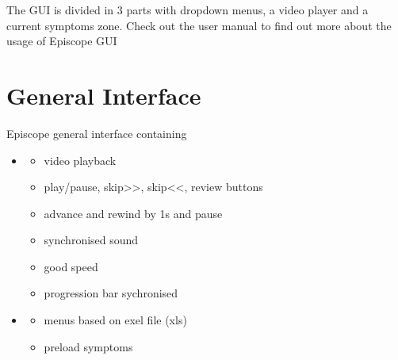 \documentclass[letterpaper,10pt,english]{sphinxmanual}
\begin{document}
\sphinxAtStartPar
The GUI is divided in 3 parts with dropdown menus, a video player and a current symptoms zone.
Check out the user manual to find out more about the usage of Episcope GUI

\sphinxstepscope


\chapter{General Interface}
\label{\detokenize{general_interface:module-general_interface}}\label{\detokenize{general_interface:general-interface}}\label{\detokenize{general_interface::doc}}
\sphinxAtStartPar
Episcope general interface containing
\begin{itemize}
\item {} \begin{description}
\begin{itemize}
\item {} 
\sphinxAtStartPar
video playback

\item {} 
\sphinxAtStartPar
play/pause, skip\textgreater{}\textgreater{}, skip\textless{}\textless{}, review buttons

\item {} 
\sphinxAtStartPar
advance and rewind by 1s and pause

\item {} 
\sphinxAtStartPar
synchronised sound

\item {} 
\sphinxAtStartPar
good speed

\item {} 
\sphinxAtStartPar
progression bar sychronised

\end{itemize}

\end{description}

\item {} \begin{description}
\begin{itemize}
\item {} 
\sphinxAtStartPar
menus based on exel file (xls)

\item {} 
\sphinxAtStartPar
pre\sphinxhyphen{}load symptoms


\end{itemize}
\end{description}
\end{itemize}
\end{document}
